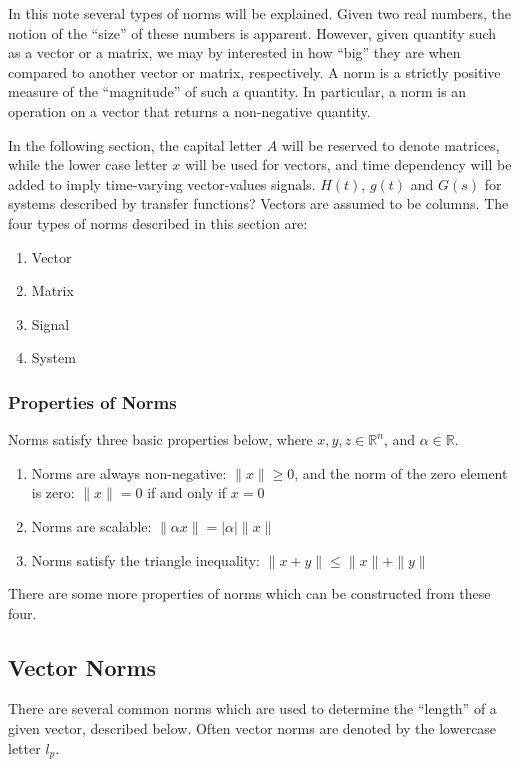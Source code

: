 In this note several types of norms will be explained.
Given two real numbers, the notion of the ``size'' of these numbers is apparent.
However, given quantity such as a vector or a matrix, we may by interested in how ``big'' they are when compared to another vector or matrix, respectively.
A norm is a strictly positive measure of the ``magnitude'' of such a quantity.
In particular, a norm is an operation on a vector that returns a non-negative quantity.

In the following section, the capital letter $A$ will be reserved to denote matrices, while the lower case letter $x$ will be used for vectors, and time dependency will be added to imply time-varying vector-values signals.
$H(t)$, $g(t)$ and $G(s)$ for systems described by transfer functions?
Vectors are assumed to be columns.
The four types of norms described in this section are:
\begin{enumerate}
  \item{Vector}
  \item{Matrix}
  \item{Signal}
  \item{System}
\end{enumerate}

\subsubsection{Properties of Norms}
Norms satisfy three basic properties below, where $x,y,z\in\mathbb{R}^{n}$, and $\alpha\in\mathbb{R}$.
\begin{enumerate}
  \setlength{\itemsep}{-4pt}
  \item{Norms are always non-negative: $\|x\|\geq0$, and the norm of the zero element is zero: $\|x\|=0$ if and only if $x=0$}
  \item{Norms are scalable: $\|\alpha x\|=|\alpha|\|x\|$}
  \item{Norms satisfy the triangle inequality: $\|x+y\|\leq\|x\|+\|y\|$}
\end{enumerate}
There are some more properties of norms which can be constructed from these four.

\subsection{Vector Norms}

There are several common norms which are used to determine the ``length'' of a given vector, described below.
Often vector norms are denoted by the lowercase letter $l_{p}$.


